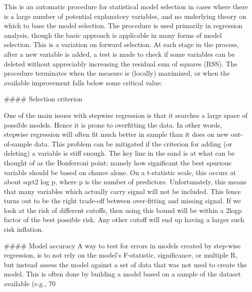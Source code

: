 This is an automatic procedure for statistical model selection in cases where there is a large number of potential explanatory variables, and no underlying theory on which to base the model selection. The procedure is used primarily in regression analysis, though the basic approach is applicable in many forms of model selection. This is a variation on forward selection. At each stage in the process, after a new variable is added, a test is made to check if some variables can be deleted without appreciably increasing the residual sum of squares (RSS). The procedure terminates when the measure is (locally) maximized, or when the available improvement falls below some critical value.

#### Selection criterion

One of the main issues with stepwise regression is that it searches a large space of possible models. Hence it is prone to overfitting the data. In other words, stepwise regression will often fit much better in sample than it does on new out-of-sample data. This problem can be mitigated if the criterion for adding (or deleting) a variable is stiff enough. The key line in the sand is at what can be thought of as the Bonferroni point: namely how significant the best spurious variable should be based on chance alone. On a t-statistic scale, this occurs at about sqrt{2 log p}, where p is the number of predictors. Unfortunately, this means that many variables which actually carry signal will not be included. This fence turns out to be the right trade-off between over-fitting and missing signal. If we look at the risk of different cutoffs, then using this bound will be within a 2logp factor of the best possible risk. Any other cutoff will end up having a larger such risk inflation.

#### Model accuracy
A way to test for errors in models created by step-wise regression, is to not rely on the model's F-statistic, significance, or multiple R, but instead assess the model against a set of data that was not used to create the model. This is often done by building a model based on a sample of the dataset available (e.g., 70%

